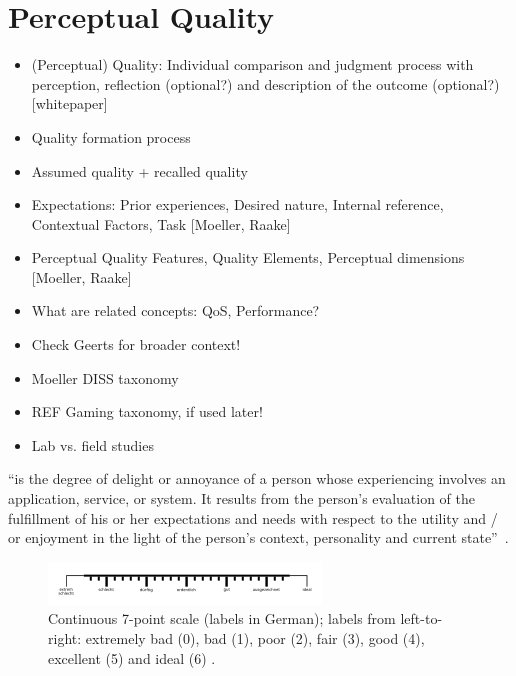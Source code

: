 \section{Perceptual Quality}
\begin{itemize}
\item (Perceptual) Quality: Individual comparison and judgment process with perception, reflection (optional?) and description of the outcome (optional?) [whitepaper]
\item Quality formation process
\item Assumed quality + recalled quality
\item Expectations: Prior experiences, Desired nature, Internal reference, Contextual Factors, Task [Moeller, Raake] 
\item Perceptual Quality Features, Quality Elements, Perceptual dimensions [Moeller, Raake]%
\item What are related concepts: QoS, Performance?

\item Check Geerts for broader context!
\item Moeller DISS taxonomy
\item REF Gaming taxonomy, if used later!

\item Lab vs. field studies
\end{itemize}

\begin{definition}
``is the degree of delight or annoyance of a person whose experiencing involves an application, service, or system. It results from the person’s evaluation of the fulfillment of his or her expectations and needs with respect to the utility and / or enjoyment in the light of the person’s context, personality and current state''~\citep{moller_quality_2014}.
\end{definition}

\begin{figure}
	\includegraphics[width=1\columnwidth]{fig/quality7pt_scale}
	\caption{Continuous 7-point scale (labels in German); labels from left-to-right: extremely bad (0), bad (1), poor (2), fair (3), good (4), excellent (5) and ideal (6) \citep{itu-t_p.805:_2007}.}
	\label{img:qualityScale}
\end{figure}

